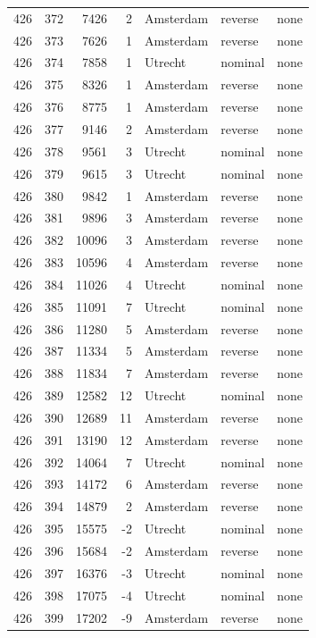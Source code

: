 \documentclass{template/openetcs_article}
\begin{document}
\begin{longtable}{|r |r |r |r |l |l |l |}
426 & 372 & 7426 & 2 & Amsterdam & reverse & none \\
426 & 373 & 7626 & 1 & Amsterdam & reverse & none \\
426 & 374 & 7858 & 1 & Utrecht & nominal & none \\
426 & 375 & 8326 & 1 & Amsterdam & reverse & none \\
426 & 376 & 8775 & 1 & Amsterdam & reverse & none \\
426 & 377 & 9146 & 2 & Amsterdam & reverse & none \\
426 & 378 & 9561 & 3 & Utrecht & nominal & none \\
426 & 379 & 9615 & 3 & Utrecht & nominal & none \\
426 & 380 & 9842 & 1 & Amsterdam & reverse & none \\
426 & 381 & 9896 & 3 & Amsterdam & reverse & none \\
426 & 382 & 10096 & 3 & Amsterdam & reverse & none \\
426 & 383 & 10596 & 4 & Amsterdam & reverse & none \\
426 & 384 & 11026 & 4 & Utrecht & nominal & none \\
426 & 385 & 11091 & 7 & Utrecht & nominal & none \\
426 & 386 & 11280 & 5 & Amsterdam & reverse & none \\
426 & 387 & 11334 & 5 & Amsterdam & reverse & none \\
426 & 388 & 11834 & 7 & Amsterdam & reverse & none \\
426 & 389 & 12582 & 12 & Utrecht & nominal & none \\
426 & 390 & 12689 & 11 & Amsterdam & reverse & none \\
426 & 391 & 13190 & 12 & Amsterdam & reverse & none \\
426 & 392 & 14064 & 7 & Utrecht & nominal & none \\
426 & 393 & 14172 & 6 & Amsterdam & reverse & none \\
426 & 394 & 14879 & 2 & Amsterdam & reverse & none \\
426 & 395 & 15575 & -2 & Utrecht & nominal & none \\
426 & 396 & 15684 & -2 & Amsterdam & reverse & none \\
426 & 397 & 16376 & -3 & Utrecht & nominal & none \\
426 & 398 & 17075 & -4 & Utrecht & nominal & none \\
426 & 399 & 17202 & -9 & Amsterdam & reverse & none \\

\end{longtable}
\end{document}
